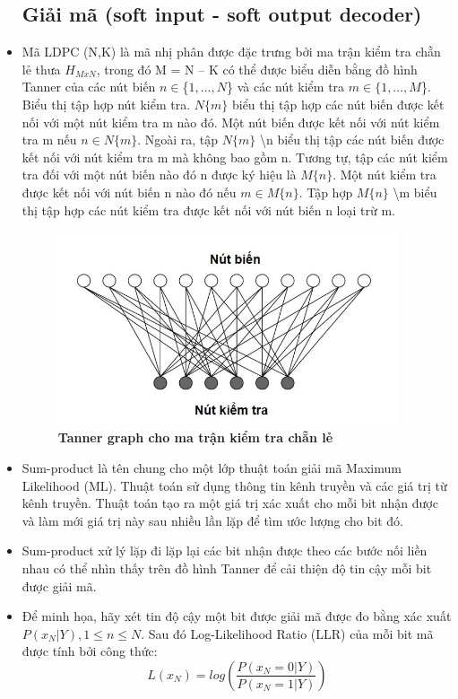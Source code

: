 \documentclass{article}
\begin{document}
\begin{itemize}
\subsection{Giải mã (soft input - soft output decoder)}  
    \item 	Mã LDPC (N,K) là mã nhị phân được đặc trưng bởi ma trận kiểm tra chẵn lẻ thưa $H_{MxN}$, trong đó M = N – K có thể được biểu diễn bằng đồ hình Tanner của các nút biến $n\in$\{$1,...,N$\} và các nút kiểm tra $m\in\{1,...,M$\}. Biểu thị tập hợp nút kiểm tra. $N\{m\}$ biểu thị tập hợp các nút biến được kết nối với một nút kiểm tra m nào đó. Một nút biến được kết nối với nút kiểm tra m nếu $n\in N\{m\}$. Ngoài ra, tập $N\{m\}$ \textbackslash n biểu thị tập các nút biến được kết nối với nút kiểm tra m mà không bao gồm n. Tương tự, tập các nút kiểm tra đối với một nút biến nào đó n được ký hiệu là $M\{n\}$. Một nút kiểm tra được kết nối với nút biến n nào đó nếu $m\in M\{n\}$. Tập hợp $ M\{n\}$ \textbackslash m biểu thị tập hợp các nút kiểm tra được kết nối với nút biến n loại trừ m.
    \begin{figure}[H]
    \centering
    \includegraphics[width=10cm]{images/tanner2.JPG}
    \caption[Tanner graph cho ma trận kiểm tra chẵn lẻ ]{\bfseries\fontsize{12pt}{0pt} \selectfont Tanner graph cho ma trận kiểm tra chẵn lẻ} %
    \label{hinh13}
\end{figure}  
    \item Sum-product là tên chung cho một lớp thuật toán giải mã Maximum Likelihood (ML). Thuật toán sử dụng thông tin kênh truyền và các giá trị từ kênh truyền. Thuật toán tạo ra một giá trị xác xuất cho mỗi bit nhận được và làm mới giá trị này sau nhiều lần lặp để tìm ước lượng cho bit đó.
    \item Sum-product xử lý lặp đi lặp lại các bit nhận được theo các bước nối liền nhau có thể nhìn thấy trên đồ hình Tanner để cải thiện độ tin cậy mỗi bit được giải mã.
    \item 	Để minh họa, hãy xét tin độ cậy một bit được giải mã được đo bằng xác xuất $P(x_N |Y),1\le n \le N$. Sau đó Log-Likelihood Ratio (LLR) của mỗi bit mã được tính bởi công thức:
    \begin{equation}\label{134}
        L(x_N)= log (\frac {P(x_N=0|Y)}{P(x_N=1|Y)})
    \end{equation}
    

\end{itemize}
\end{document}
